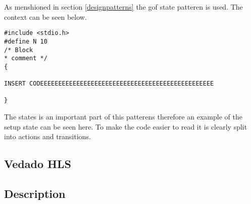 As menshioned in section \ref{designpatterns} the gof state patteren is used. The context can be seen below.
\begin{lstlisting}[style=customc++, label={lst:listingExample}, caption={Example listing.}]
#include <stdio.h>
#define N 10
/* Block
* comment */
{

INSERT CODEEEEEEEEEEEEEEEEEEEEEEEEEEEEEEEEEEEEEEEEEEEEEEEE

}
\end{lstlisting}

The states is an important part of this patterens therefore an example of the setup state can be seen here. To make the code easier to read it is clearly split into actions and transitions. 


\subsection{Vedado HLS}

\subsection{Description}

\noindent{}